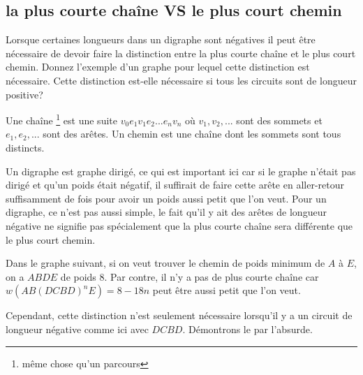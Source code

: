 \subsection{la plus courte chaîne VS le plus court chemin} Lorsque certaines longueurs dans un digraphe sont négatives il peut être nécessaire de devoir faire la distinction entre la plus courte chaîne et le plus court chemin. Donnez l'exemple d'un graphe pour lequel cette distinction est nécessaire. Cette distinction est-elle nécessaire si tous les circuits sont de longueur positive?
\begin{solution}
Une chaîne \footnote{même chose qu'un parcours} est une suite $v_0e_1v_1e_2...e_nv_n $ où $v_1,v_2,...$ sont des sommets et $e_1,e_2,...$ sont des arêtes.  Un chemin est une chaîne dont les sommets sont tous distincts.

Un digraphe est graphe dirigé, ce qui est important ici car si le graphe n'était pas dirigé et qu'un poids
était négatif, il suffirait de faire cette arête en aller-retour suffisamment de fois pour avoir un poids aussi petit que l'on veut.
Pour un digraphe, ce n'est pas aussi simple, le fait qu'il y ait des arêtes de longueur négative ne signifie pas spécialement que la plus courte chaîne sera différente que le plus court chemin.

  Dans le graphe suivant, si on veut trouver le chemin de poids minimum de $A$ à $E$, on a $ABDE$ de poids $8$.
  Par contre, il n'y a pas de plus courte chaîne car $w(AB(DCBD)^nE) = 8 - 18n$ peut être aussi petit que l'on veut.

  \begin{center}
  \end{center}

  Cependant, cette distinction n'est seulement nécessaire lorsqu'il y a
  un circuit de longueur négative comme ici avec $DCBD$.
  Démontrons le par l'absurde.


\end{solution}
